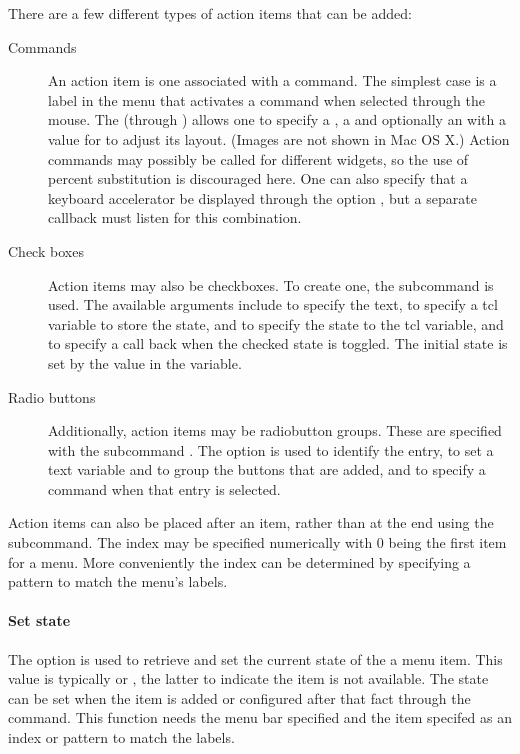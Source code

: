 There are a few different types of action items that can be added:
 
\begin{description}
\item[Commands] 
An action item is one associated with a command. The simplest case is
a label in the menu that activates a command when selected through the
mouse. The  (through
) allows one to specify a
, a  and optionally an  with a
value for  to adjust its layout. (Images are not shown
in Mac OS X.) Action commands may possibly be called for different
widgets, so the use of percent substitution is discouraged here. One can also specify that a keyboard accelerator be displayed through the option , but a separate callback must listen for this combination.

\item[Check boxes] 
Action items may also be checkboxes. To create one, the subcommand
 is used. The available
arguments include  to specify the text,  to
specify a tcl variable to store the state,  and
 to specify the state to the tcl variable, and
 to specify a call back when the checked state is
toggled. The initial state is set by the value in the  \TCL\/ variable.

\item[Radio buttons] 
Additionally, action items may be radiobutton groups. These are
specified with the subcommand . The  option is used to identify
the entry,  to set a text variable and to group the
buttons that are added, and  to specify a command when
that entry is selected.
\end{description}

Action items can also be placed after an item, rather than at the end
using the  subcommand. The
index may be specified numerically with 0 being the first item for a
menu.  More conveniently the index can be determined by specifying a
pattern to match the menu's labels.


\paragraph{Set state}
The  option is used to retrieve and set the current state of the a menu item.
This value is typically  or
, the latter to indicate the item is not available. The
state can be set when the item is added or configured after that fact
through the  command. This function
needs the menu bar specified and the item specifed as an index or
pattern to match the labels.

